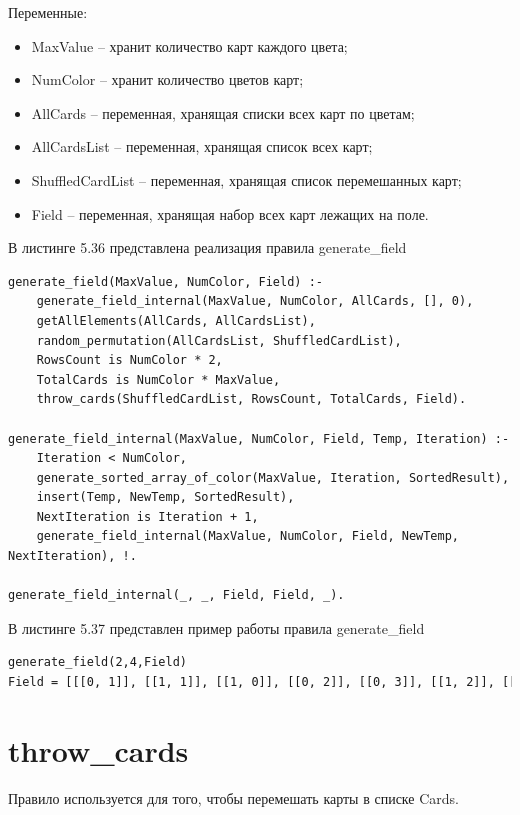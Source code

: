 \documentclass[12pt]{report}
\begin{document}
Переменные:
\begin{itemize}
\item MaxValue – хранит количество карт каждого цвета;
\item NumColor – хранит количество цветов карт;
\item AllCards – переменная, хранящая списки всех карт по цветам;
\item AllCardsList – переменная, хранящая список всех карт;
\item ShuffledCardList – переменная, хранящая список перемешанных карт;
\item Field – переменная, хранящая набор всех карт лежащих на поле.
\end{itemize}

В листинге 5.36 представлена реализация правила generate\_field

\begin{lstlisting}[label=some-code, caption=реализация правила generate\_field]
generate_field(MaxValue, NumColor, Field) :-
	generate_field_internal(MaxValue, NumColor, AllCards, [], 0),
	getAllElements(AllCards, AllCardsList),
	random_permutation(AllCardsList, ShuffledCardList),
	RowsCount is NumColor * 2,
	TotalCards is NumColor * MaxValue,
	throw_cards(ShuffledCardList, RowsCount, TotalCards, Field).
	
generate_field_internal(MaxValue, NumColor, Field, Temp, Iteration) :-
	Iteration < NumColor,
	generate_sorted_array_of_color(MaxValue, Iteration, SortedResult),
	insert(Temp, NewTemp, SortedResult),
	NextIteration is Iteration + 1,
	generate_field_internal(MaxValue, NumColor, Field, NewTemp, NextIteration), !.

generate_field_internal(_, _, Field, Field, _).
\end{lstlisting}

В листинге 5.37 представлен пример работы правила generate\_field

\begin{lstlisting}[label=some-code, caption=реализация правила generate\_field]
generate_field(2,4,Field)
Field = [[[0, 1]], [[1, 1]], [[1, 0]], [[0, 2]], [[0, 3]], [[1, 2]], [[1, 3]], [[0, 0]]]
\end{lstlisting}

\section{throw\_cards}
Правило используется для того, чтобы перемешать карты в списке Cards.
\end{document}

